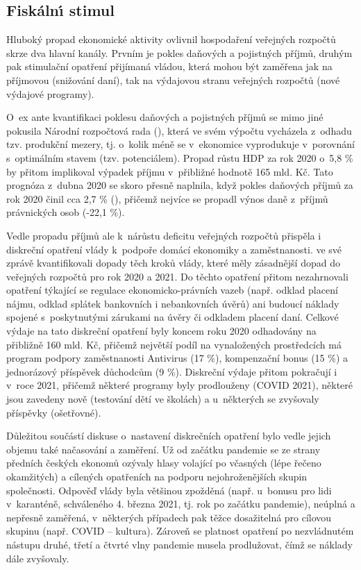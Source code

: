 \subsection*{Fisk\'{a}ln\'{\i} stimul} 
Hluboký propad ekonomické aktivity ovlivnil hospodaření veřejných rozpočtů skrze dva hlavní kanály. Prvním je pokles daňových a pojistných příjmů, druhým pak stimulační opatření přijímaná vládou, která mohou být zaměřena jak na příjmovou (snižování daní), tak na výdajovou stranu veřejných rozpočtů (nové výdajové programy). 

O~ex ante kvantifikaci poklesu daňových a pojistných příjmů se mimo jiné pokusila Národní rozpočtová rada (\cite{Hlavacek2020}), která ve svém výpočtu vycházela z~odhadu tzv. produkční mezery, tj. o~kolik méně se v~ekonomice vyprodukuje v~porovnání s~optimálním stavem (tzv. potenciálem). Propad růstu HDP za rok 2020 o~5,8 \% by přitom implikoval výpadek příjmu v~přibližné hodnotě 165 mld. Kč. Tato prognóza z~dubna 2020 se skoro přesně naplnila, když pokles daňových příjmů za rok 2020 činil cca 2,7 \% (\cite{MFCR2021}), přičemž nejvíce se propadl výnos daně z~příjmů právnických osob (-22,1 \%).

Vedle propadu příjmů ale k~nárůstu deficitu veřejných rozpočtů přispěla i diskreční opatření vlády k~podpoře domácí ekonomiky a zaměstnanosti. \cite{Hlavacek2020} ve své zprávě kvantifikovali dopady těch kroků vlády, které měly zásadnější dopad do veřejných rozpočtů pro rok 2020 a 2021. Do těchto opatření přitom nezahrnovali opatření týkající se regulace ekonomicko-právních vazeb (např. odklad placení nájmu, odklad splátek bankovních i nebankovních úvěrů) ani budoucí náklady spojené s~poskytnutými zárukami na úvěry či odkladem placení daní. Celkové výdaje na tato diskreční opatření byly koncem roku 2020 odhadovány na přibližně 160 mld. Kč, přičemž největší podíl na vynaložených prostředcích má program podpory zaměstnanosti Antivirus (17 \%), kompenzační bonus (15 \%) a jednorázový příspěvek důchodcům (9 \%). Diskreční výdaje přitom pokračují i v~roce 2021, přičemž některé programy byly prodlouženy (COVID 2021), některé jsou zavedeny nově (testování dětí ve školách) a u~některých se zvyšovaly příspěvky (ošetřovné).

Důležitou součástí diskuse o~nastavení diskrečních opatření bylo vedle jejich objemu také načasování a zaměření. Už od začátku pandemie se ze strany předních českých ekonomů ozývaly hlasy volající po včasných (lépe řečeno okamžitých) a cílených opatřeních na podporu nejohroženějších skupin spo\-le\-čno\-sti. Odpověď vlády byla většinou zpožděná (např. u~bonusu pro lidi v~karanténě, schváleného 4. března 2021, tj. rok po začátku pandemie), neúplná a nepřesně zaměřená, v~některých případech pak těžce dosažitelná pro cílovou skupinu (např. COVID – kultura). Zároveň se platnost opatření po nezvládnutém nástupu druhé, třetí a čtvrté vlny pandemie musela prodlužovat, čímž se náklady dále zvyšovaly.

